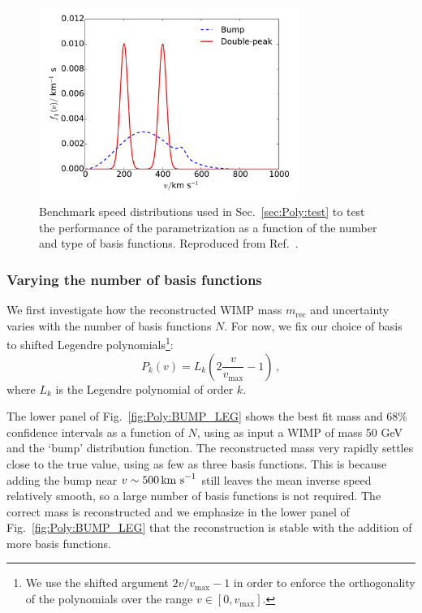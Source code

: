 \begin{figure}[t]
\centering
  \includegraphics[width=0.75\textwidth]{Poly/SpeedDistributions-VaryingN.pdf}
  \caption{Benchmark speed distributions used in Sec.~\ref{sec:Poly:test} to test the performance of the parametrization as a function of the number and type of basis functions. Reproduced from Ref.~\cite{Kavanagh:2014}.}
  \label{fig:Poly:VaryingN_distributions}
\end{figure}

\subsubsection{Varying the number of basis functions}

We first investigate how the reconstructed WIMP mass $m_\textrm{rec}$ and uncertainty varies with the number of basis functions $N$. For now, we fix our choice of basis to shifted Legendre polynomials\footnote{We use the shifted argument $2v/v_\textrm{max} - 1$ in order to enforce the orthogonality of the polynomials over the range $v \in [0, v_\textrm{max}]$.}:
\begin{equation}
P_k(v) = L_k\left(2\frac{v}{v_\textrm{max}} - 1\right)\,,
\end{equation}
where $L_k$ is the Legendre polynomial of order $k$.
 
The lower panel of Fig.~\ref{fig:Poly:BUMP_LEG} shows the best fit mass and 68\% confidence intervals as a function of $N$, using as input a WIMP of mass 50 GeV and the `bump' distribution function. The reconstructed mass very rapidly settles close to the true value, using as few as three basis functions. This is because adding the bump near $v \sim 500 \,\textrm{km s}^{-1}$ still leaves the mean inverse speed relatively smooth, so a large number of basis functions is not required. The correct mass is reconstructed and we emphasize in the lower panel of Fig.~\ref{fig:Poly:BUMP_LEG} that the reconstruction is stable with the addition of more basis functions.

